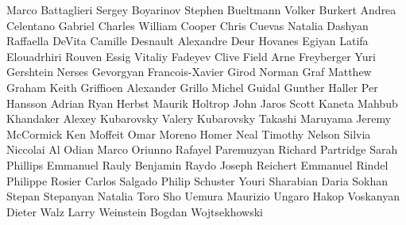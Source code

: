 Marco Battaglieri
Sergey Boyarinov
Stephen Bueltmann
 Volker Burkert
Andrea Celentano
 Gabriel Charles
William Cooper
Chris Cuevas
Natalia Dashyan
Raffaella DeVita
 Camille Desnault
 Alexandre Deur
 Hovanes Egiyan
 Latifa Elouadrhiri
Rouven Essig
 Vitaliy Fadeyev
Clive Field
Arne Freyberger
Yuri Gershtein
Nerses Gevorgyan
Francois-Xavier Girod
Norman Graf
Matthew Graham
Keith Griffioen
Alexander Grillo
Michel Guidal
Gunther Haller
Per Hansson Adrian
Ryan Herbst
Maurik Holtrop
John Jaros
Scott Kaneta
Mahbub Khandaker
Alexey Kubarovsky
Valery Kubarovsky
Takashi Maruyama
Jeremy McCormick
Ken Moffeit
Omar Moreno
Homer Neal
Timothy Nelson
Silvia Niccolai
Al Odian
Marco Oriunno
Rafayel Paremuzyan
Richard Partridge
Sarah Phillips
Emmanuel Rauly
Benjamin Raydo
Joseph Reichert
Emmanuel Rindel
Philippe Rosier
Carlos Salgado
Philip Schuster
Youri Sharabian
Daria Sokhan
Stepan Stepanyan
Natalia Toro
Sho Uemura
Maurizio Ungaro
Hakop Voskanyan
Dieter Walz
Larry Weinstein
Bogdan Wojtsekhowski